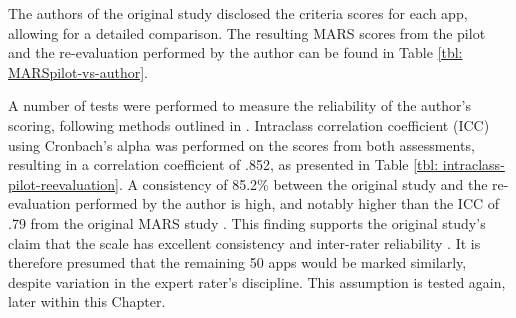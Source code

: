 The authors of the original study disclosed the criteria scores for each app, allowing for a detailed comparison. The resulting MARS scores from the pilot and the re-evaluation performed by the author can be found in Table \ref{tbl: MARSpilot-vs-author}.

\begin{table}[h]
\centering
\caption{MARS scores of initial 9 apps from Pilot study, as marked by original study and author.}
\label{tbl: MARSpilot-vs-author}
\end{table}

A number of tests were performed to measure the reliability of the author's scoring, following methods outlined in \cite{McHugh2012}. Intraclass correlation coefficient (ICC) using Cronbach's alpha was performed on the scores from both assessments, resulting in a correlation coefficient of .852, as presented in Table \ref{tbl: intraclass-pilot-reevaluation}. A consistency of 85.2\% between the original study and the re-evaluation performed by the author is high, and notably higher than the ICC of .79 from the original MARS study \cite{Stoyanov2015}. This finding supports the original study's claim that the scale has excellent consistency and inter-rater reliability \cite{Stoyanov2015}. It is therefore presumed that the remaining 50 apps would be marked similarly, despite variation in the expert rater's discipline. This assumption is tested again, later within this Chapter.

